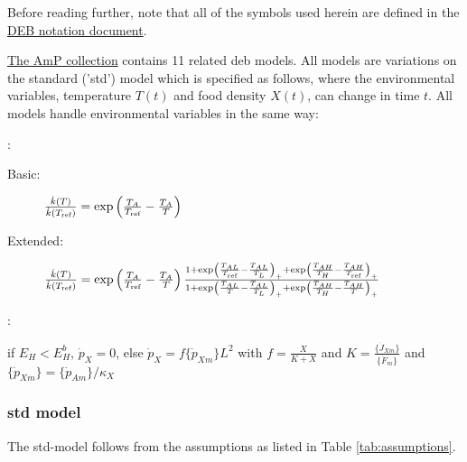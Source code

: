 
Before reading further, note that all of the symbols used herein are defined in the \href{https://www.bio.vu.nl/thb/deb/deblab/bib/Kooy2010_n.pdf}{DEB notation document}.

\href{https://www.bio.vu.nl/thb/deb/deblab/add_my_pet/about.html}{The AmP collection} contains  11 related {\sc deb} models.
All models are variations on the standard ('std') model which is specified as follows, where
the environmental variables, temperature $T(t)$ and food density $X(t)$, can change in time $t$.
All models handle environmental variables in the same way:

\vspace{5mm}: {\small
\begin{description}
   \item[Basic: ]  $\frac{\dot{k}(T)} {\dot{k}(T_{\mbox{\tiny ref}})} =  
	    \exp \left( \frac{T_A} {T_{\mbox{\tiny ref}}} - \frac{T_A} {T} \right)$

   \item[Extended: ]  $\frac{\dot{k}(T)} {\dot{k}(T_{\mbox{\tiny ref}})} =  
	    \exp \left( \frac{T_A} {T_{\mbox{\tiny ref}}} - \frac{T_A} {T} \right) 
			\frac{1 + \exp\left(\frac{T_{AL}} {T_{\mbox{\tiny ref}}} - \frac{T_{AL}} {T_L}\right)_+ + 
			          \exp\left(\frac{T_{AH}} {T_H} - \frac{T_{AH}} {T_{\mbox{\tiny ref}}}\right)_+}
	         {1 + \exp \left( \frac{T_{AL}} {T} - \frac{T_{AL}} {T_L} \right)_+ + \exp \left(\frac{T_{AH}} {T_H} - \frac{T_{AH}} {T} \right)_+}$
\end{description}}

\vspace{5mm}: {\small
\begin{description}
  \item if $E_H < E_H^b$, $\dot{p}_X = 0$,  else $\dot{p}_X = f \{\dot{p}_{Xm}\} L^2$ with 
	   $f = \frac{X} {K + X}$ and $K = \frac{\{\dot{J}_{Xm}\}} {\{\dot{F}_m\}}$ and
		 $\{\dot{p}_{Xm}\} = \{\dot{p}_{Am}\}/ \kappa_X$
\end{description}}


\subsubsection{std model}

The std-model follows from the assumptions as listed in Table \ref{tab:assumptions}.

